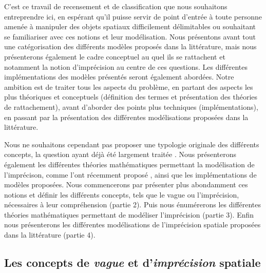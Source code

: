 C’est ce travail de recensement et de classification que nous
souhaitons entreprendre ici, en espérant qu’il puisse servir de point
d’entrée à toute personne amenée à manipuler des objets spatiaux
difficilement délimitables ou souhaitant se familiariser avec ces
notions et leur modélisation. Nous présentons avant tout une
catégorisation des différents modèles proposés dans la littérature,
mais nous présenterons également le cadre conceptuel au quel ils se
rattachent et notamment la notion d’imprécision au centre de ces
questions. Les différentes implémentations des modèles présentés
seront également abordées. Notre ambition est de traiter tous les
aspects du problème, en partant des aspects les plus théoriques et
conceptuels (définition des termes et présentation des théories de
rattachement), avant d’aborder des points plus techniques
(implémentations), en passant par la présentation des différentes
modélisations proposées dans la littérature.

Nous ne souhaitons cependant pas proposer une typologie originale des
différents concepts, la question ayant déjà été largement traitée
\autocite{Bouchon-Meunier1995,Fisher2006,Devilliers2019}. Nous
présenterons également les différentes théories mathématiques
permettant la modélisation de l’imprécison, comme l’ont récemment
proposé \textcite{Batton-Hubert2019}, ainsi que les implémentations de
modèles proposées.  Nous commencerons par présenter plus abondamment
ces notions et définir les différents concepts, tels que le vague ou
l’imprécision, nécessaires à leur compréhension (partie 2). Puis nous
énumérerons les différentes théories mathématiques permettant de
modéliser l’imprécision (partie 3). Enfin nous présenterons les
différentes modélisations de l’imprécision spatiale proposées dans la
littérature (partie 4).


\subsection{Les concepts de \emph{vague} et d’\emph{imprécision} spatiale}

